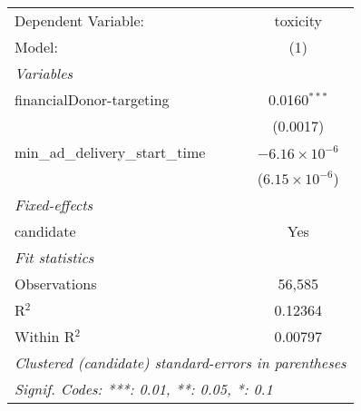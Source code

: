 \begingroup
\centering
\begin{tabular}{lc}
   \tabularnewline \midrule \midrule
   Dependent Variable:                & toxicity\\  
   Model:                             & (1)\\  
   \midrule
   \emph{Variables}\\
   financialDonor-targeting           & 0.0160$^{***}$\\   
                                      & (0.0017)\\   
   min\_ad\_delivery\_start\_time     & $-6.16\times 10^{-6}$\\    
                                      & ($6.15\times 10^{-6}$)\\    
   \midrule
   \emph{Fixed-effects}\\
   candidate                          & Yes\\  
   \midrule
   \emph{Fit statistics}\\
   Observations                       & 56,585\\  
   R$^2$                              & 0.12364\\  
   Within R$^2$                       & 0.00797\\  
   \midrule \midrule
   \multicolumn{2}{l}{\emph{Clustered (candidate) standard-errors in parentheses}}\\
   \multicolumn{2}{l}{\emph{Signif. Codes: ***: 0.01, **: 0.05, *: 0.1}}\\
\end{tabular}
\par\endgroup


